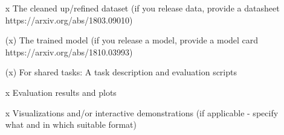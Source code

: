 \documentclass[a4paper,12pt,numbers=enddot]{scrartcl}
\begin{document}
\begin{itemize}
	\setlength\itemsep{-5pt}
	\item[x] The cleaned up/refined dataset (if you release data, provide a datasheet https://arxiv.org/abs/1803.09010)
	\item[(x)] The trained model (if you release a model, provide a model card https://arxiv.org/abs/1810.03993)
	\item[(x)] For shared tasks: A task description and evaluation scripts
	\item[x] Evaluation results and plots
	\item[x] Visualizations and/or interactive demonstrations (if applicable - specify what and in which suitable format)
\end{itemize}
\end{document}
